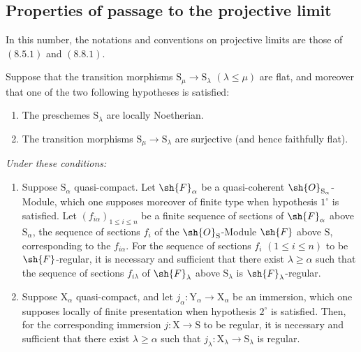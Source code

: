 \subsection{Properties of passage to the projective limit}
\label{subsection:IV.19.8}

In this number, the notations and conventions on projective limits are those of $(8.5.1)$ and $(8.8.1)$.

\begin{proposition}[19.8.1]
\label{IV.19.8.1}
Suppose that the transition morphisms $\mathrm{S}_\mu\to\mathrm{S}_\lambda$ $(\lambda\leqslant\mu)$ are flat, and moreover that one of the two following hypotheses is satisfied:
\begin{enumerate}
\item[$1^\circ$] The preschemes $\mathrm{S}_\lambda$ are locally Noetherian.
\item[$2^\circ$] The transition morphisms $\mathrm{S}_\mu\to\mathrm{S}_\lambda$ are surjective (and hence faithfully flat).
\end{enumerate}

\emph{Under these conditions:}
\begin{enumerate}
\item[\rm(i)] Suppose $\mathrm{S}_\alpha$ quasi-compact. Let $\sh{F}_\alpha$ be a quasi-coherent $\sh{O}_{\mathrm{S}_\alpha}$-Module, which one supposes moreover of finite type when hypothesis $1^\circ$ is satisfied. Let $(f_{i\alpha})_{1\leqslant i\leqslant n}$ be a finite sequence of sections of $\sh{F}_\alpha$ above $\mathrm{S}_\alpha$, the sequence of sections $f_i$ of the $\sh{O}_\mathrm{S}$-Module $\sh{F}$ above $\mathrm{S}$, corresponding to the $f_{i\alpha}$. For the sequence of sections $f_i$ $(1\leqslant i\leqslant n)$ to be $\sh{F}$-regular, it is necessary and sufficient that there exist $\lambda\geqslant\alpha$ such that the sequence of sections $f_{i\lambda}$ of $\sh{F}_\lambda$ above $\mathrm{S}_\lambda$ is $\sh{F}_\lambda$-regular.
\item[\rm(ii)] Suppose $\mathrm{X}_\alpha$ quasi-compact, and let $j_\alpha:\mathrm{Y}_\alpha\to\mathrm{X}_\alpha$ be an immersion, which one supposes locally of finite presentation when hypothesis $2^\circ$ is satisfied. Then, for the corresponding immersion $j:\mathrm{X}\to\mathrm{S}$ to be regular, it is necessary and sufficient that there exist $\lambda\geqslant\alpha$ such that $j_\lambda:\mathrm{X}_\lambda\to\mathrm{S}_\lambda$ is regular.
\end{enumerate}
\end{proposition}

